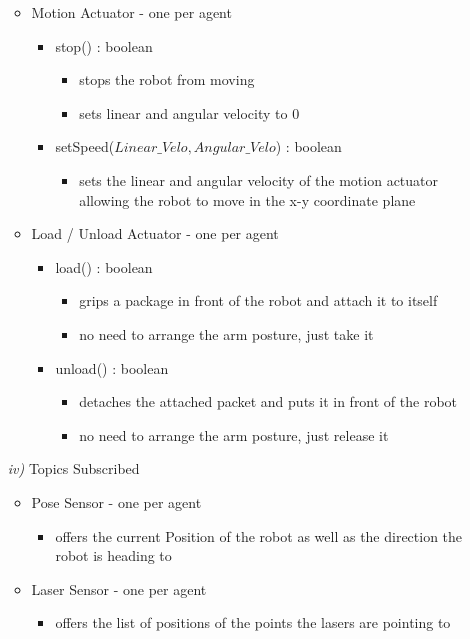 \documentclass{article}
\begin{document}
\begin{enumerate}
\begin{itemize}
		\item Motion Actuator - one per agent
		\begin{itemize}
			\item stop() : boolean
			\begin{itemize}
				\item stops the robot from moving
				\item sets linear and angular velocity to 0
			\end{itemize}
			\item setSpeed($Linear\_Velo, Angular\_Velo$) : boolean
			\begin{itemize}
				\item sets the linear and angular velocity of the motion actuator allowing the robot to move in the x-y coordinate plane
			\end{itemize}
		\end{itemize}
		\item Load / Unload Actuator - one per agent
		\begin{itemize}
			\item load() : boolean
			\begin{itemize}
				\item grips a package in front of the robot and attach it to itself
				\item no need to arrange the arm posture, just take it
			\end{itemize}
			\item unload() : boolean
			\begin{itemize}
				\item detaches the attached packet and puts it in front of the robot
				\item no need to arrange the arm posture, just release it
			\end{itemize}
		\end{itemize}
	\end{itemize}
	\item[\textit{iv)}] Topics Subscribed
	\begin{itemize}
		\item Pose Sensor - one per agent
		\begin{itemize}
			\item offers the current Position of the robot as well as the direction the robot is heading to
		\end{itemize}
		\item Laser Sensor - one per agent
		\begin{itemize}
			\item offers the list of positions of the points the lasers are pointing to 

\end{itemize}
\end{itemize}
\end{enumerate}
\end{document}
